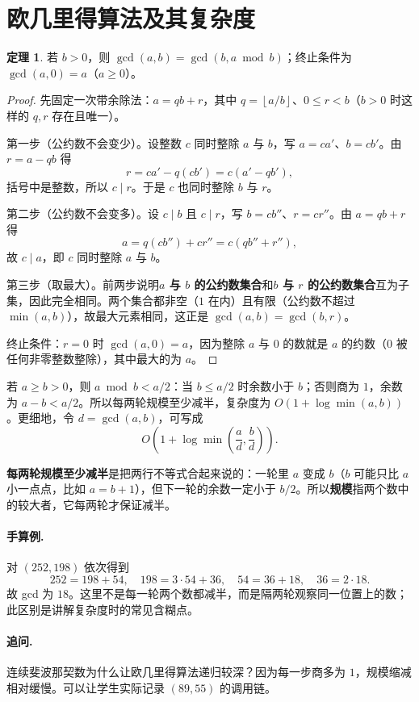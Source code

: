 \documentclass[UTF8,a4paper,11pt,twoside,openright,fontset=fandol]{ctexbook}
\theoremstyle{definition}
\newtheorem{theorem}[definition]{定理}
\newcommand{\floor}[1]{\left\lfloor #1\right\rfloor}
\begin{document}
\section{欧几里得算法及其复杂度}
\begin{theorem}
若 $b>0$，则 $\gcd(a,b)=\gcd(b,a\bmod b)$；终止条件为 $\gcd(a,0)=a$（$a\ge0$）。
\end{theorem}
\begin{proof}
先固定一次带余除法：$a=qb+r$，其中 $q=\floor{a/b}$、$0\le r<b$（$b>0$ 时这样的 $q,r$ 存在且唯一）。

第一步（公约数不会变少）。设整数 $c$ 同时整除 $a$ 与 $b$，写 $a=ca'$、$b=cb'$。由 $r=a-qb$ 得
\[
 r=ca'-q(cb')=c(a'-qb'),
\]
括号中是整数，所以 $c\mid r$。于是 $c$ 也同时整除 $b$ 与 $r$。

第二步（公约数不会变多）。设 $c\mid b$ 且 $c\mid r$，写 $b=cb''$、$r=cr''$。由 $a=qb+r$ 得
\[
 a=q(cb'')+cr''=c(qb''+r''),
\]
故 $c\mid a$，即 $c$ 同时整除 $a$ 与 $b$。

第三步（取最大）。前两步说明\textbf{$a$ 与 $b$ 的公约数集合}和\textbf{$b$ 与 $r$ 的公约数集合}互为子集，因此完全相同。两个集合都非空（$1$ 在内）且有限（公约数不超过 $\min(a,b)$），故最大元素相同，这正是 $\gcd(a,b)=\gcd(b,r)$。

终止条件：$r=0$ 时 $\gcd(a,0)=a$，因为整除 $a$ 与 $0$ 的数就是 $a$ 的约数（$0$ 被任何非零整数整除），其中最大的为 $a$。
\end{proof}
若 $a\ge b>0$，则 $a\bmod b<a/2$：当 $b\le a/2$ 时余数小于 $b$；否则商为 $1$，余数为 $a-b<a/2$。所以每两轮规模至少减半，复杂度为 $O(1+\log\min(a,b))$。更细地，令 $d=\gcd(a,b)$，可写成
\[
 O\!\left(1+\log\min\left(\frac ad,\frac bd\right)\right).
\]

\begin{tip}
\textbf{每两轮规模至少减半}是把两行不等式合起来说的：一轮里 $a$ 变成 $b$（$b$ 可能只比 $a$ 小一点点，比如 $a=b+1$），但下一轮的余数一定小于 $b/2$。所以\textbf{规模}指两个数中的较大者，它每两轮才保证减半。
\end{tip}



\paragraph{手算例.} 对 $(252,198)$ 依次得到
\[
252=198+54,\quad198=3\cdot54+36,\quad54=36+18,\quad36=2\cdot18.
\]
故 gcd 为 $18$。这里不是每一轮两个数都减半，而是隔两轮观察同一位置上的数；此区别是讲解复杂度时的常见含糊点。
\paragraph{追问.} 连续斐波那契数为什么让欧几里得算法递归较深？因为每一步商多为 $1$，规模缩减相对缓慢。可以让学生实际记录 $(89,55)$ 的调用链。
\end{document}
